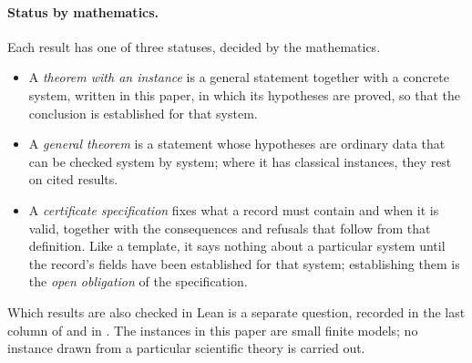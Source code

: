 \paragraph{Status by mathematics.} Each result has one of three statuses, decided by the
mathematics.
\begin{itemize}[nosep]
  \item A \emph{theorem with an instance} is a general statement together with a concrete
        system, written in this paper, in which its hypotheses are proved, so that the
        conclusion is established for that system.
  \item A \emph{general theorem} is a statement whose hypotheses are ordinary data that can
        be checked system by system; where it has classical instances, they rest on
        cited results.
  \item A \emph{certificate specification} fixes what a record must contain and when it is
        valid, together with the consequences and refusals that follow from that
        definition. Like a template, it says nothing about a particular system until the
        record's fields have been established for that system; establishing them is the
        \emph{open obligation} of the specification.
\end{itemize}
Which results are also checked in Lean is a separate question, recorded in the last column
of  and in . The instances in this paper are small finite
models; no instance drawn from a particular scientific theory is carried out.

